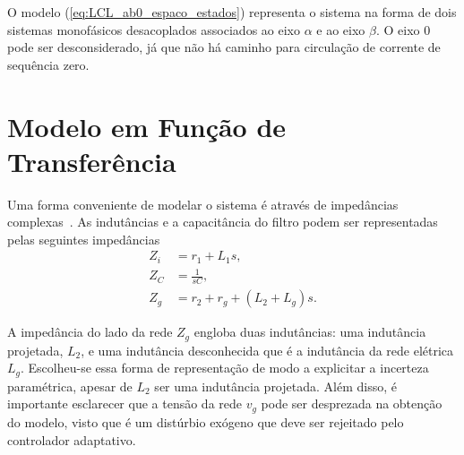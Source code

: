     O modelo (\ref{eq:LCL_ab0_espaco_estados}) representa o sistema na forma de dois
    sistemas monofásicos desacoplados associados ao eixo $\alpha$ e ao eixo $\beta$. O
    eixo $0$ pode ser desconsiderado, já que não há caminho para circulação de corrente
    de sequência zero.

\section{Modelo em Função de Transferência}

    Uma forma conveniente de modelar o sistema é através de impedâncias
    complexas~\cite{ref:XU}. As indutâncias e a capacitância do filtro podem ser
    representadas pelas seguintes impedâncias
    \begin{equation}
        \begin{split}
            Z_i & = r_1 + L_1 s \text{,} \\
            Z_C & = \frac{1}{s C} \text{,} \\
            Z_g & = r_2 + r_g + \left( L_2 + L_g \right) s \text{.}
        \end{split}
    \end{equation}

    A impedância do lado da rede $Z_g$ engloba duas indutâncias: uma indutância projetada,
    $L_2$, e uma indutância desconhecida que é a indutância da rede elétrica $L_g$. Escolheu-se
    essa forma de representação de modo a explicitar a incerteza paramétrica, apesar de $L_2$
    ser uma indutância projetada. Além disso, é importante esclarecer que a tensão da rede
    $v_g$ pode ser desprezada na obtenção do modelo, visto que é um distúrbio exógeno que
    deve ser rejeitado pelo controlador adaptativo.




